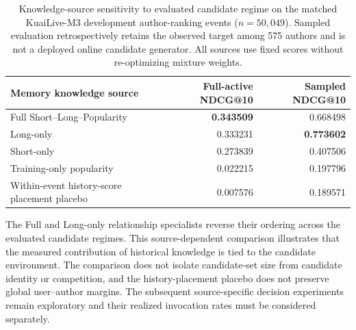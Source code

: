 \begin{table}[!htbp]
\centering
\caption{Knowledge-source sensitivity to evaluated candidate regime on the matched KuaiLive-M3 development author-ranking events ($n=50{,}049$). Sampled evaluation retrospectively retains the observed target among 575 authors and is not a deployed online candidate generator. All sources use fixed scores without re-optimizing mixture weights.}
\label{tab:n9-b2-source-regime-draft}
\footnotesize
\setlength{\tabcolsep}{7pt}
\begin{tabular}{@{}lrr@{}}
\toprule
Memory knowledge source & Full-active NDCG@10 & Sampled NDCG@10\\
\midrule
Full Short--Long--Popularity & \textbf{0.343509} & 0.668498\\
Long-only & 0.333231 & \textbf{0.773602}\\
Short-only & 0.273839 & 0.407506\\
Training-only popularity & 0.022215 & 0.197796\\
Within-event history-score placement placebo & 0.007576 & 0.189571\\
\bottomrule
\end{tabular}
\end{table}

The Full and Long-only relationship specialists reverse their ordering across the evaluated candidate regimes. This source-dependent comparison illustrates that the measured contribution of historical knowledge is tied to the candidate environment. The comparison does not isolate candidate-set size from candidate identity or competition, and the history-placement placebo does not preserve global user--author margins. The subsequent source-specific decision experiments remain exploratory and their realized invocation rates must be considered separately.
